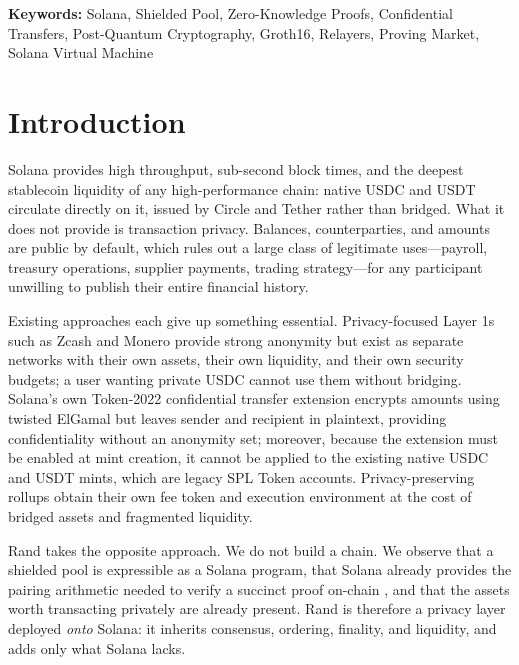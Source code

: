\documentclass[11pt,a4paper]{article}
\begin{document}
\noindent\textbf{Keywords:} Solana, Shielded Pool, Zero-Knowledge Proofs, Confidential Transfers, Post-Quantum Cryptography, Groth16, Relayers, Proving Market, Solana Virtual Machine

\tableofcontents
\newpage

\section{Introduction}

Solana provides high throughput, sub-second block times, and the deepest stablecoin liquidity of any high-performance chain: native USDC and USDT circulate directly on it, issued by Circle and Tether rather than bridged. What it does not provide is transaction privacy. Balances, counterparties, and amounts are public by default, which rules out a large class of legitimate uses---payroll, treasury operations, supplier payments, trading strategy---for any participant unwilling to publish their entire financial history.

Existing approaches each give up something essential. Privacy-focused Layer 1s such as Zcash \cite{Hopwood2016} and Monero \cite{Noether2015} provide strong anonymity but exist as separate networks with their own assets, their own liquidity, and their own security budgets; a user wanting private USDC cannot use them without bridging. Solana's own Token-2022 confidential transfer extension \cite{SolanaToken2022} encrypts amounts using twisted ElGamal but leaves sender and recipient in plaintext, providing confidentiality without an anonymity set; moreover, because the extension must be enabled at mint creation, it cannot be applied to the existing native USDC and USDT mints, which are legacy SPL Token accounts. Privacy-preserving rollups obtain their own fee token and execution environment at the cost of bridged assets and fragmented liquidity.

Rand takes the opposite approach. We do not build a chain. We observe that a shielded pool is expressible as a Solana program, that Solana already provides the pairing arithmetic needed to verify a succinct proof on-chain \cite{SolanaAltBn128}, and that the assets worth transacting privately are already present. Rand is therefore a privacy layer deployed \emph{onto} Solana: it inherits consensus, ordering, finality, and liquidity, and adds only what Solana lacks.
\end{document}
